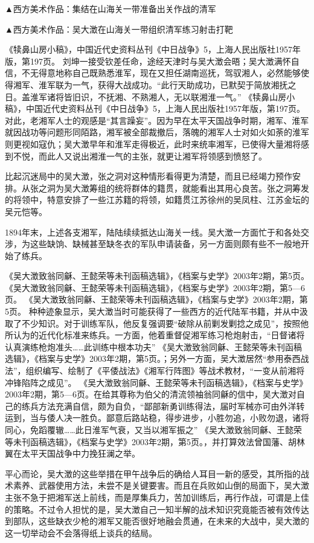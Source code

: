 \documentclass[12pt,UTF8]{ctexbook}
\begin{document}
▲西方美术作品：集结在山海关一带准备出关作战的清军


▲西方美术作品：吴大澂在山海关一带组织清军练习射击打靶

《犊鼻山房小稿》，中国近代史资料丛刊《中日战争》5，上海人民出版社1957年版，第197页。
刘坤一接受钦差任命，途经天津时与吴大澂会晤；吴大澂满怀自信，不无得意地称自己既熟悉淮军，现在又担任湖南巡抚，驾驭湘人，必然能够使得湘军、淮军联为一气，获得大战成功。“此行天助成功，已默契于简放湘抚之日。盖淮军诸将皆旧识，不抚湘、不熟湘人，无以联湘淮一气。” 《犊鼻山房小稿》，中国近代史资料丛刊《中日战争》5，上海人民出版社1957年版，第197页。对此，老湘军人士的观感是“其言躁妄”。因为早在太平天国战争时期，湘军、淮军就因战功等问题形同陌路，湘军被全部裁撤后，落魄的湘军人士对如火如荼的淮军则更视如寇仇；吴大澂早年和淮军走得极近，此时来统率湘军，已使得大量湘将感到不悦，而此人又说出湘淮一气的主张，就更让湘军将领感到愤怒了。

比起沉迷局中的吴大澂，张之洞对这种情形看得更为清楚，而且已经竭力预作安排。从张之洞为吴大澂筹组的统将群体的籍贯，就能看出其用心良苦。张之洞筹发的将领中，特意安排了一些江苏籍的将领，如籍贯江苏徐州的吴凤柱、江苏金坛的吴元恺等。

1894年末，上述各支湘军，陆陆续续抵达山海关一线。吴大澂一方面忙于和各处交涉，为这些缺饷、缺械甚至缺冬衣的军队申请装备，另一方面则颇有些不一般地开始了练兵。

《吴大澂致翁同龢、王懿荣等未刊函稿选辑》，《档案与史学》2003年2期，第5页。
《吴大澂致翁同龢、王懿荣等未刊函稿选辑》，《档案与史学》2003年2期，第5—6页。
《吴大澂致翁同龢、王懿荣等未刊函稿选辑》，《档案与史学》2003年2期，第5页。
种种迹象显示，吴大澂当时可能获得了一些西方的近代陆军书籍，并从中汲取了不少知识。对于训练军队，他反复强调要“破除从前剿发剿捻之成见”，按照他所认为的近代化标准来练兵。一方面，他着重督促湘军练习枪炮射击，“日督诸将认真演练枪炮准头……此训练中根本功夫” 《吴大澂致翁同龢、王懿荣等未刊函稿选辑》，《档案与史学》2003年2期，第5页。；另外一方面，吴大澂居然“参用泰西战法”，组织编写、绘制了《平倭战法》《湘军行阵图》等战术教材，“一变从前湘将冲锋陷阵之成见”。 《吴大澂致翁同龢、王懿荣等未刊函稿选辑》，《档案与史学》2003年2期，第5—6页。在给其尊称为伯父的清流领袖翁同龢的信中，吴大澂对自己的练兵方法充满自信，颇为自负，“鄙部新勇训练得法，届时军械亦可由外洋转运到，当与倭人决一胜负。鄙意后路站稳，得步进步，小胜勿追，小败勿退，诸将同心，免蹈覆辙……此日淮军气衰，又当以湘军振之” 《吴大澂致翁同龢、王懿荣等未刊函稿选辑》，《档案与史学》2003年2期，第5页。，并打算效法曾国藩、胡林翼在太平天国战争中力挽狂澜之举。

平心而论，吴大澂的这些举措在甲午战争后的确给人耳目一新的感受，其所指的战术素养、武器使用方法，未尝不是关键要害。而且在兵败如山倒的局面下，吴大澂主张不急于把湘军送上前线，而是厚集兵力，苦加训练后，再行作战，可谓是上佳的策略。不过令人担忧的是，吴大澂自己一知半解的战术知识究竟能否被有效传达到部队，这些缺衣少枪的湘军又能否很好地融会贯通，在未来的大战中，吴大澂的这一切举动会不会落得纸上谈兵的结局。
\end{document}
